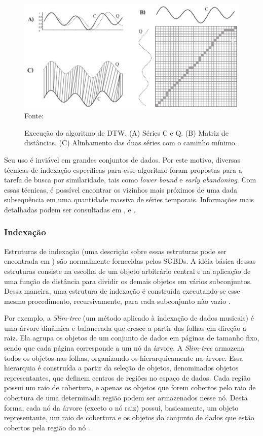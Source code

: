 \begin{figure}[!htb]
   \centering
   \caption{Execução do algoritmo de DTW. (A) Séries C e Q. (B) Matriz de distâncias. (C) Alinhamento das duas séries com o caminho mínimo.}\label{fig:dtw} 
   \includegraphics[scale=0.40]{figuras/dtw.png}
   \\Fonte: \cite{keogh2004}
\end{figure}

Seu uso é inviável em grandes conjuntos de dados. Por este motivo, diversas técnicas de indexação específicas para esse algoritmo foram propostas para a tarefa de busca por similaridade, tais como \textit{lower bound} e \textit{early abandoning}. Com essas técnicas, é possível encontrar os vizinhos mais próximos de uma dada subsequência em uma quantidade massiva de séries temporais. Informações mais detalhadas podem ser consultadas em \cite{mizutani2006}, \cite{kruskal1983} e \cite{juang1991}.

\subsubsection{Indexação}\label{subsubsec:indexacao}
Estruturas de indexação (uma descrição sobre essas estruturas pode ser encontrada em \cite{garciaMolina2002}) são normalmente fornecidas pelos SGBDs. A idéia básica dessas estruturas consiste na escolha de um objeto arbitrário central e na aplicação de uma função de distância para dividir os demais objetos em vários subconjuntos. Dessa maneira, uma estrutura de indexação é construída executando-se esse mesmo procedimento, recursivamente, para cada subconjunto não vazio \cite{barioni2006}.

Por exemplo, a \textit{Slim-tree} (um método aplicado à indexação de dados musicais) é uma árvore dinâmica e balanceada que cresce a partir das folhas em direção a raiz. Ela agrupa os objetos de um conjunto de dados em páginas de tamanho fixo, sendo que cada página corresponde a um nó da árvore. A \textit{Slim-tree} armazena todos os objetos nas folhas, organizando-os hierarquicamente na árvore. Essa hierarquia é construída a partir da seleção de objetos, denominados objetos representantes, que definem centros de regiões no espaço de dados. Cada região possui um raio de cobertura, e apenas os objetos que forem cobertos pelo raio de cobertura de uma determinada região podem ser armazenados nesse nó. Desta forma, cada nó da árvore
(exceto o nó raiz) possui, basicamente, um objeto representante, um raio de cobertura e os objetos do conjunto de dados que estão cobertos pela região do nó \cite{traina2000}.


